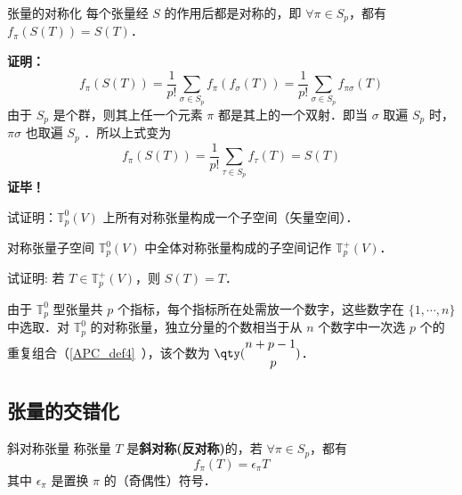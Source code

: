 \begin{theorem}{张量的对称化}
每个张量经 $S$ 的作用后都是对称的，即 $\forall \pi\in S_p$，都有 $f_\pi(S(T))=S(T)$．
\end{theorem}
\textbf{证明：}
\begin{equation}
f_\pi(S(T))=\frac{1}{p!}\sum_{\sigma\in S_p} f_\pi(f_\sigma(T))=\frac{1}{p!}\sum_{\sigma\in S_p} f_{\pi\sigma}(T)
\end{equation}
由于 $S_p$ 是个群，则其上任一个元素 $\pi$ 都是其上的一个双射．即当 $\sigma$ 取遍 $S_p$ 时，$\pi\sigma$ 也取遍 $S_p$ ．所以上式变为
\begin{equation}
f_\pi(S(T))=\frac{1}{p!}\sum_{\tau\in S_p} f_{\tau}(T)=S(T)
\end{equation}
\textbf{证毕！}

\begin{exercise}{}
试证明：$\mathbb{T}_p^0(V)$ 上所有对称张量构成一个子空间（矢量空间）．
\end{exercise}
\begin{definition}{对称张量子空间}
$\mathbb{T}_p^0(V)$ 中全体对称张量构成的子空间记作 $\mathbb{T}_p^+(V)$．
\end{definition}
\begin{exercise}{}
试证明: 若 $T\in\mathbb{T}_p^+(V)$，则 $S(T)=T$．
\end{exercise}

由于 $\mathbb{T}_p^0$ 型张量共 $p$ 个指标，每个指标所在处需放一个数字，这些数字在 $\{1,\cdots,n\}$ 中选取．对 $\mathbb{T}_p^0$ 的对称张量，独立分量的个数相当于从 $n$ 个数字中一次选 $p$ 个的重复组合（\autoref{APC_def4}~），该个数为 $\qty(\begin{aligned}
&n+p-1\\&\qquad p
\end{aligned})$．
\subsection{张量的交错化}
\begin{definition}{斜对称张量}
称张量 $T$ 是\textbf{斜对称(反对称)}的，若 $\forall \pi\in S_p$，都有
\begin{equation}\label{SIofTe_eq4}
f_\pi(T)=\epsilon_\pi T
\end{equation}
其中 $\epsilon_\pi$ 是置换 $\pi$ 的（奇偶性）符号．
\end{definition}

